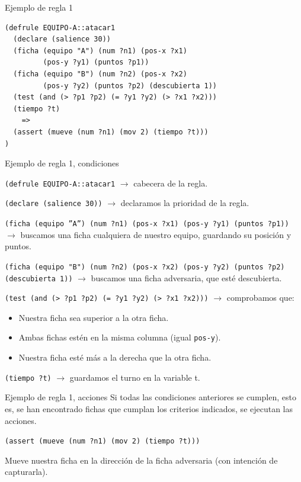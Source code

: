\documentclass[smaller,spanish,xcolor=svgnames]{beamer}
\begin{document}
\begin{frame}[fragile]{Ejemplo de regla 1}
\begin{verbatim}
(defrule EQUIPO-A::atacar1
  (declare (salience 30))
  (ficha (equipo "A") (num ?n1) (pos-x ?x1)
         (pos-y ?y1) (puntos ?p1))
  (ficha (equipo "B") (num ?n2) (pos-x ?x2)
         (pos-y ?y2) (puntos ?p2) (descubierta 1))
  (test (and (> ?p1 ?p2) (= ?y1 ?y2) (> ?x1 ?x2)))
  (tiempo ?t)
    =>
  (assert (mueve (num ?n1) (mov 2) (tiempo ?t)))
)
\end{verbatim}
\end{frame}

\begin{frame}[fragile]{Ejemplo de regla 1, condiciones}

\small
\texttt{(defrule EQUIPO-A::atacar1} $\rightarrow$ cabecera de la regla.

\medskip

\texttt{(declare (salience 30))} $\rightarrow$ declaramos la prioridad de la regla.

\medskip

\texttt{(ficha (equipo ''A'') (num ?n1) (pos-x ?x1) (pos-y ?y1) (puntos ?p1))} $\rightarrow$ buscamos una ficha cualquiera de nuestro equipo, guardando su posición y puntos.

\medskip

\texttt{(ficha (equipo "B") (num ?n2) (pos-x ?x2) (pos-y ?y2) (puntos ?p2) (descubierta 1))} $\rightarrow$ buscamos una ficha adversaria, que esté descubierta.

\medskip

\texttt{(test (and (> ?p1 ?p2) (= ?y1 ?y2) (> ?x1 ?x2)))} $\rightarrow$ comprobamos que:
\begin{itemize}
\item Nuestra ficha sea superior a la otra ficha.
\item Ambas fichas estén en la misma columna (igual \texttt{pos-y}).
\item Nuestra ficha esté más a la derecha que la otra ficha.
\end{itemize}

\medskip

\texttt{(tiempo ?t)} $\rightarrow$ guardamos el turno en la variable t.
\end{frame}

\begin{frame}{Ejemplo de regla 1, acciones}
  Si todas las condiciones anteriores se cumplen, esto es, se han encontrado
  fichas que cumplan los criterios indicados, se ejecutan las acciones.

  \medskip

  \texttt{(assert (mueve (num ?n1) (mov 2) (tiempo ?t)))}

  \medskip

  Mueve nuestra ficha en la dirección de la ficha adversaria (con intención de capturarla).
\end{frame}
\end{document}
